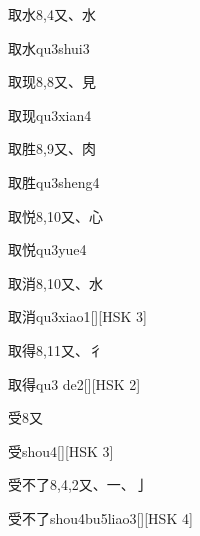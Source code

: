 \begin{entry}{取水}{8,4}{⼜、⽔}
  \begin{phonetics}{取水}{qu3shui3}
  \end{phonetics}
\end{entry}

\begin{entry}{取现}{8,8}{⼜、⾒}
  \begin{phonetics}{取现}{qu3xian4}
  \end{phonetics}
\end{entry}

\begin{entry}{取胜}{8,9}{⼜、⾁}
  \begin{phonetics}{取胜}{qu3sheng4}
  \end{phonetics}
\end{entry}

\begin{entry}{取悦}{8,10}{⼜、⼼}
  \begin{phonetics}{取悦}{qu3yue4}
  \end{phonetics}
\end{entry}

\begin{entry}{取消}{8,10}{⼜、⽔}
  \begin{phonetics}{取消}{qu3xiao1}[][HSK 3]
  \end{phonetics}
\end{entry}

\begin{entry}{取得}{8,11}{⼜、⼻}
  \begin{phonetics}{取得}{qu3 de2}[][HSK 2]
  \end{phonetics}
\end{entry}

\begin{entry}{受}{8}{⼜}
  \begin{phonetics}{受}{shou4}[][HSK 3]
  \end{phonetics}
\end{entry}

\begin{entry}{受不了}{8,4,2}{⼜、⼀、⼅}
  \begin{phonetics}{受不了}{shou4bu5liao3}[][HSK 4]
  \end{phonetics}
\end{entry}

